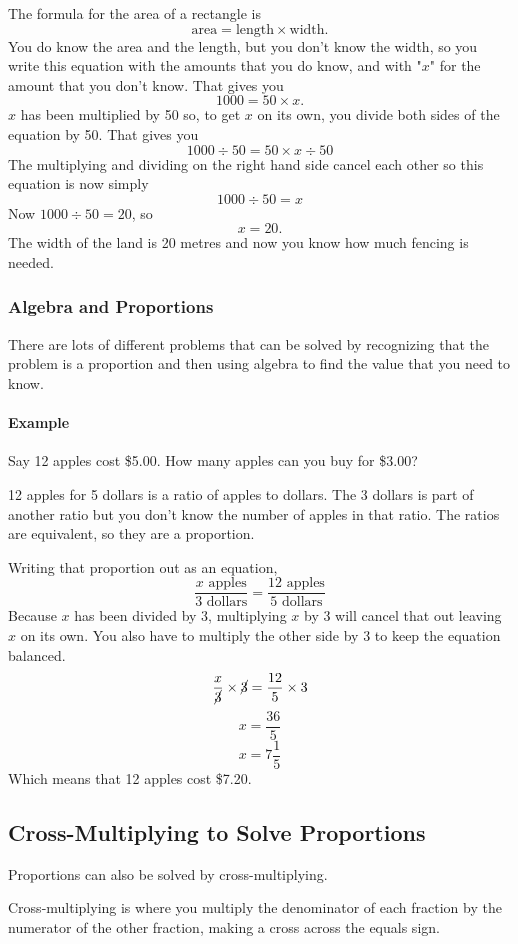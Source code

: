 \documentclass{article}
\begin{document}
\begin{spacing}{1.25}
\begin{enumerate}
The formula for the area of a rectangle is
$$\text{area} = \text{length} \times \text{width.}$$
You do know the area and the length, but you don't know the width, so you write this equation with the amounts that you do know, and with "$x$" for the amount that you don't know. That gives you
$$1000 = 50 \times x.$$
$x$ has been multiplied by 50 so, to get $x$ on its own, you divide both sides of the equation by 50. That gives you
$$1000 \div 50 = 50 \times x \div 50$$
The multiplying and dividing on the right hand side cancel each other so this equation is now simply
$$1000 \div 50 = x$$
Now $1000 \div 50 = 20$, so
$$x = 20.$$
The width of the land is 20 metres and now you know how much fencing is needed.

\subsubsection*{Algebra and Proportions}
There are lots of different problems that can be solved by recognizing that the problem is a proportion and then using algebra to find the value that you need to know.

\paragraph{Example}
Say 12 apples cost \$5.00. How many apples can you buy for \$3.00?

12 apples for 5 dollars is a ratio of apples to dollars. The 3 dollars is part of another ratio but you don't know the number of apples in that ratio. The ratios are equivalent, so they are a proportion.

Writing that proportion out as an equation,
$$\frac{x\text{ apples}}{3\text{ dollars}}=\frac{12\text{ apples}}{5\text{ dollars}}$$
Because $x$ has been divided by 3, multiplying $x$ by 3 will cancel that out leaving $x$ on its own. You  also have to multiply the other side by 3 to keep the equation balanced.
$$\frac{x}{\cancel{3}}\times\cancel{3}=\frac{12}{5}\times3$$
$$x=\frac{36}{5}$$
$$x=7 \frac{1}{5}$$
Which means that 12 apples cost \$7.20.\\

\subsection*{Cross-Multiplying to Solve Proportions}
Proportions can also be solved by cross-multiplying.

Cross-multiplying is where you multiply the denominator of each fraction by the numerator of the other fraction, making a cross across the equals sign.


\end{enumerate}
\end{spacing}
\end{document}
